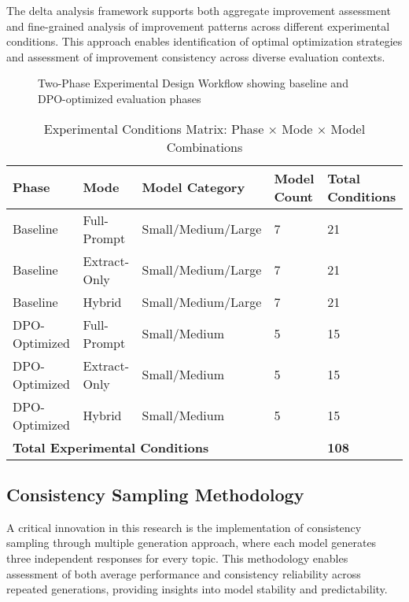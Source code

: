The delta analysis framework supports both aggregate improvement assessment and fine-grained analysis of improvement patterns across different experimental conditions. This approach enables identification of optimal optimization strategies and assessment of improvement consistency across diverse evaluation contexts.

\begin{figure}[htbp]
    \centering
    \caption{Two-Phase Experimental Design Workflow showing baseline and DPO-optimized evaluation phases}
    \label{fig:two-phase-design}
\end{figure}

\begin{table}[htbp]
    \centering
    \caption{Experimental Conditions Matrix: Phase × Mode × Model Combinations}
    \label{tab:experimental-conditions}
    \begin{tabular}{|l|l|l|l|l|}
    \hline
    \textbf{Phase} & \textbf{Mode} & \textbf{Model Category} & \textbf{Model Count} & \textbf{Total Conditions} \\
    \hline
    Baseline & Full-Prompt & Small/Medium/Large & 7 & 21 \\
    Baseline & Extract-Only & Small/Medium/Large & 7 & 21 \\
    Baseline & Hybrid & Small/Medium/Large & 7 & 21 \\
    DPO-Optimized & Full-Prompt & Small/Medium & 5 & 15 \\
    DPO-Optimized & Extract-Only & Small/Medium & 5 & 15 \\
    DPO-Optimized & Hybrid & Small/Medium & 5 & 15 \\
    \hline
    \multicolumn{4}{|l|}{\textbf{Total Experimental Conditions}} & \textbf{108} \\
    \hline
    \end{tabular}
\end{table}

\subsection{Consistency Sampling Methodology}

A critical innovation in this research is the implementation of consistency sampling through multiple generation approach, where each model generates three independent responses for every topic. This methodology enables assessment of both average performance and consistency reliability across repeated generations, providing insights into model stability and predictability.

